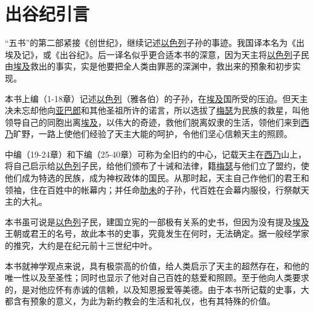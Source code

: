 \chapter*{出谷纪引言}


“五书”的第二部紧接《创世纪》，继续记述\uline{以色列}子孙的事迹。我国译本名为《出埃及记》，或《出谷纪》。后一译名似乎更合适本书的深意，因为天主将\uline{以色列}子民由\uline{埃及}救出的事实，实是他要把全人类由罪恶的深渊中，救出来的预象和初步实现。

本书上编（1-18章）记述\uline{以色列}（雅各伯）的子孙，在\uline{埃及}国所受的压迫。但天主决未忘却他向\uline{亚巴郎}和其他圣祖所许的诺言，所以选拔了\uline{梅瑟}为民族的救星，叫他领导自己的同胞出离\uline{埃及}，以伟大的奇迹，救他们脱离奴隶的生活，领他们来到\uline{西乃}旷野，一路上使他们经验了天主大能的呵护，令他们坚心信赖天主的照顾。

中编（19-24章）和下编（25-40章）可称为全旧约的中心，记载天主在\uline{西乃}山上，将自己启示给\uline{以色列}子民，给他们颁布了十诫和法律，籍\uline{梅瑟}与他们立了盟约，使他们成为特选的民族，成为神权政体的国民。从那时起，天主自己作他们的君王和领袖，住在百姓中的帐幕内；并任命\uline{肋未}的子孙，代百姓在会幕内服役，行祭献天主的大礼。

本书虽可说是\uline{以色列}子民，建国立宪的一部极有关系的史书，但因为没有提及\uline{埃及}王朝或君王的名号，故此本书的史事，究竟发生在何时，无法确定。据一般经学家的推究，大约是在纪元前十三世纪中叶。

本书就神学观点来说，具有极崇高的价值，给人类启示了天主的超然存在，和他的唯一性以及至圣性；同时也显示了他对自己百姓的慈爱和照顾。至于他向人类要求的，是对他应怀有赤诚的信赖，以及知恩报爱等美德。由于本书所记载的史事，大都含有预象的意义，为此为新约教会的生活和礼仪，也有其特殊的价值。
